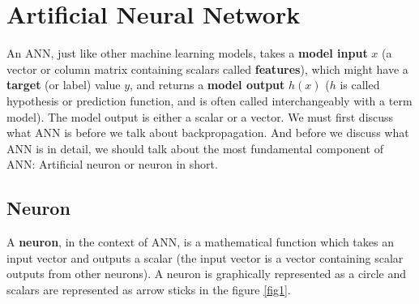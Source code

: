 \documentclass[letterpaper, 11pt]{article}
\numberwithin{equation}{section}
\numberwithin{figure}{section}
\numberwithin{table}{section}
\begin{document}
\tableofcontents
\clearpage

\pagestyle{fancy}

\section{Artificial Neural Network}
An ANN, just like other machine learning models, takes a \textbf{model input} \(x\) (a vector or column matrix containing scalars called \textbf{features}), which might have a \textbf{target} (or label) value \(y\), and returns a \textbf{model output} \(h(x)\) (\(h\) is called hypothesis or prediction function, and is often called interchangeably with a term model). The model output is either a scalar or a vector. We must first discuss what ANN is before we talk about backpropagation. And before we discuss what ANN is in detail, we should talk about the most fundamental component of ANN: Artificial neuron or neuron in short. 

\subsection{Neuron}
A \textbf{neuron}, in the context of ANN, is a mathematical function which takes an input vector and outputs a scalar (the input vector is a vector containing scalar outputs from other neurons). A neuron is graphically represented as a circle and scalars are represented as arrow sticks in the figure \ref{fig1}.

\end{document}
